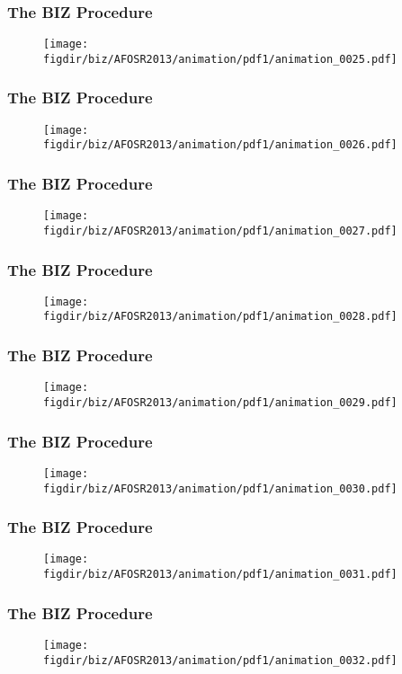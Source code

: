 \documentclass[13pt]{beamer}
\newcommand{\figdir}{../../fig}
\begin{document}
\begin{frame}\frametitle{The BIZ Procedure}\begin{figure}\texttt{[image: \\figdir/biz/AFOSR2013/animation/pdf1/animation\_0025.pdf]}\end{figure}\end{frame}
\begin{frame}\frametitle{The BIZ Procedure}\begin{figure}\texttt{[image: \\figdir/biz/AFOSR2013/animation/pdf1/animation\_0026.pdf]}\end{figure}\end{frame}
\begin{frame}\frametitle{The BIZ Procedure}\begin{figure}\texttt{[image: \\figdir/biz/AFOSR2013/animation/pdf1/animation\_0027.pdf]}\end{figure}\end{frame}
\begin{frame}\frametitle{The BIZ Procedure}\begin{figure}\texttt{[image: \\figdir/biz/AFOSR2013/animation/pdf1/animation\_0028.pdf]}\end{figure}\end{frame}
\begin{frame}\frametitle{The BIZ Procedure}\begin{figure}\texttt{[image: \\figdir/biz/AFOSR2013/animation/pdf1/animation\_0029.pdf]}\end{figure}\end{frame}
\begin{frame}\frametitle{The BIZ Procedure}\begin{figure}\texttt{[image: \\figdir/biz/AFOSR2013/animation/pdf1/animation\_0030.pdf]}\end{figure}\end{frame}
\begin{frame}\frametitle{The BIZ Procedure}\begin{figure}\texttt{[image: \\figdir/biz/AFOSR2013/animation/pdf1/animation\_0031.pdf]}\end{figure}\end{frame}
\begin{frame}\frametitle{The BIZ Procedure}\begin{figure}\texttt{[image: \\figdir/biz/AFOSR2013/animation/pdf1/animation\_0032.pdf]}\end{figure}\end{frame}
\end{document}
